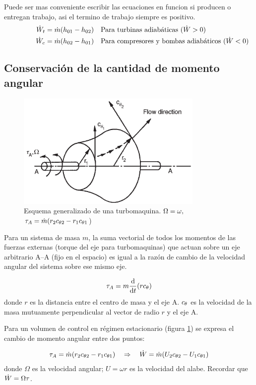 \documentclass{article}
\begin{document}
Puede ser mas conveniente escribir las ecuaciones en funcion si producen o entregan trabajo, asi el termino de trabajo siempre es positivo.
\begin{align*}
        \qquad \qquad \dot{W}_t &= \dot{m} (h_{01}-h_{02}) \quad \text{Para turbinas adiabáticas ($\dot{W}>0$)} \\
        \dot{W}_c &= \dot{m} (h_{02}-h_{01}) \quad \text{Para compresores y bombas adiabáticos ($\dot{W}<0$)} 
\end{align*}

\subsection{Conservación de la cantidad de momento angular}


\begin{figure}[ht!]
    \centering
    \includegraphics[width=9cm]{fig/turb.png}
    \caption{Esquema generalizado de una turbomaquina. $\Omega=\omega,\quad$      $\tau_A=\dot{m}(r_2 c_{\theta 2} -r_1 c_{\theta 1}$)}
    \label{fig:turbina}
\end{figure}
Para un sistema de masa $m$, la suma vectorial de todos los momentos de las fuerzas externas (torque del eje para turbomaquinas) que actuan sobre un eje arbitrario A--A (fijo en el espacio) es igual  a la razón de cambio de la velocidad angular del sistema sobre ese mismo eje.

\[
\tau_{A} = m \frac{\textrm{d}}{\textrm{d} t} (r c_{\theta })
\]
donde $r$ es la distancia entre el centro de masa y el eje A. $c_{\theta }$ es la velocidad de la masa mutuamente perpendicular al vector de radio $r$ y el eje A. 

Para un volumen de control en régimen estacionario (figura \ref{fig:turbina}) se expresa el cambio de momento angular entre dos puntos:

\begin{equation}\label{eq:eulerparaTubomaquinas}
    \tau_{A}= \dot{m} (r_2c_{\theta 2} -r_1 c_{\theta 1})  \quad \Rightarrow\quad \dot{W} =\dot{m} (U_2 c_{\theta 2}- U_1 c_{\theta 1})  
\end{equation}
donde $\Omega$ es la velocidad angular; $U=\omega r$ es la velocidad del alabe. Recordar que $\dot{W} = \Omega \tau$.
\end{document}
